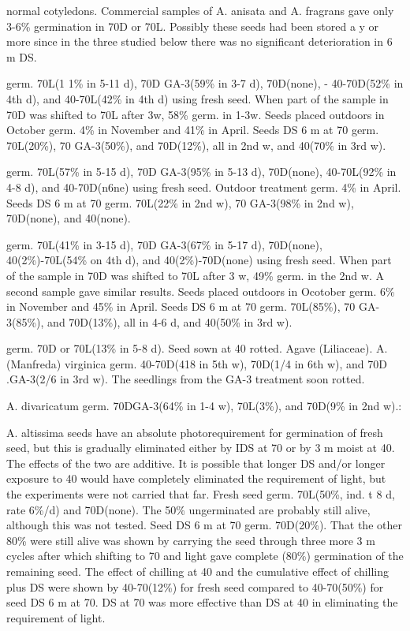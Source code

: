 \begin{description}
normal cotyledons. Commercial samples of A. anisata and A. fragrans gave only 3-6\%
germination in 70D or 70L. Possibly these seeds had been stored a y or more since in
the three studied below there was no significant deterioration in 6 m DS.
\item[A. foeniculum] germ. 70L(1 1\% in 5-11 d), 70D GA-3(59\% in 3-7 d), 70D(none),
- 40-70D(52\% in 4th d), and 40-70L(42\% in 4th d) using fresh seed. When part of the
sample in 70D was shifted to 70L after 3w, 58\% germ. in 1-3w. Seeds placed
outdoors in October germ. 4\% in November and 41\% in April. Seeds DS 6 m at 70
germ. 70L(20\%), 70 GA-3(50\%), and 70D(12\%), all in 2nd w, and 40(70\% in 3rd w).
\item[A. nepetoides] germ. 70L(57\% in 5-15 d), 70D GA-3(95\% in 5-13 d), 70D(none),
40-70L(92\% in 4-8 d), and 40-70D(n6ne) using fresh seed. Outdoor treatment germ.
4\% in April. Seeds DS 6 m at 70 germ. 70L(22\% in 2nd w), 70 GA-3(98\% in 2nd w),
70D(none), and 40(none).
\item[A. scrophulariaefolia] germ. 70L(41\% in 3-15 d), 70D GA-3(67\% in 5-17 d),
70D(none), 40(2\%)-70L(54\% on 4th d), and 40(2\%)-70D(none) using fresh seed.
When part of the sample in 70D was shifted to 70L after 3 w, 49\% germ. in the 2nd w.
A second sample gave similar results. Seeds placed outdoors in Ocotober germ. 6\%
in November and 45\% in April. Seeds DS 6 m at 70 germ. 70L(85\%), 70 GA-3(85\%),
and 70D(13\%), all in 4-6 d, and 40(50\% in 3rd w).
\item[A. urticifolium] germ. 70D or 70L(13\% in 5-8 d). Seed sown at 40 rotted.
Agave (Liliaceae). A. (Manfreda) virginica germ. 40-70D(418 in 5th w),
70D(1/4 in 6th w), and 70D .GA-3(2/6 in 3rd w). The seedlings from the GA-3 treatment
soon rotted.

\item[Aichryson (Crassulaceae)] A. divaricatum germ. 70DGA-3(64\% in 1-4 w),
70L(3\%), and 70D(9\% in 2nd w).:

\item[Ailanthus (Simaroubaceae)] A. altissima seeds have an absolute
photorequirement for germination of fresh seed, but this is gradually eliminated either
by IDS at 70 or by 3 m moist at 40. The effects of the two are additive. It is possible that
longer DS and/or longer exposure to 40 would have completely eliminated the
requirement of light, but the experiments were not carried that far. Fresh seed germ.
70L(50\%, ind. t 8 d, rate 6\%/d) and 70D(none). The 50\% ungerminated are probably
still alive, although this was not tested. Seed DS 6 m at 70 germ. 70D(20\%). That the
other 80\% were still alive was shown by carrying the seed through three more 3 m
cycles after which shifting to 70 and light gave complete (80\%) germination of the
remaining seed. The effect of chilling at 40 and the cumulative effect of chilling plus
DS were shown by 40-70(12\%) for fresh seed compared to 40-70(50\%) for seed DS 6
m at 70. DS at 70 was more effective than DS at 40 in eliminating the requirement of
light.


\end{description}
